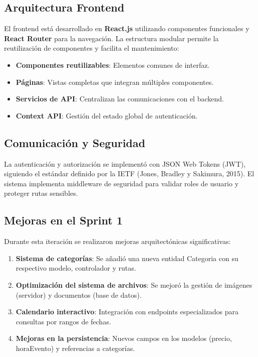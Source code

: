 \subsection*{Arquitectura Frontend}
El frontend está desarrollado en \textbf{React.js} utilizando componentes funcionales y \textbf{React Router} para la navegación. La estructura modular permite la reutilización de componentes y facilita el mantenimiento:
\begin{itemize}
  \item \textbf{Componentes reutilizables}: Elementos comunes de interfaz.
  \item \textbf{Páginas}: Vistas completas que integran múltiples componentes.
  \item \textbf{Servicios de API}: Centralizan las comunicaciones con el backend.
  \item \textbf{Context API}: Gestión del estado global de autenticación.
\end{itemize}

\subsection*{Comunicación y Seguridad}
La autenticación y autorización se implementó con JSON Web Tokens (JWT), siguiendo el estándar definido por la IETF (Jones, Bradley y Sakimura, 2015). El sistema implementa middleware de seguridad para validar roles de usuario y proteger rutas sensibles.

\subsection*{Mejoras en el Sprint 1}
Durante esta iteración se realizaron mejoras arquitectónicas significativas:
\begin{enumerate}
  \item \textbf{Sistema de categorías}: Se añadió una nueva entidad {Categoria} con su respectivo modelo, controlador y rutas.
  \item \textbf{Optimización del sistema de archivos}: Se mejoró la gestión de imágenes (servidor) y documentos (base de datos).
  \item \textbf{Calendario interactivo}: Integración con endpoints especializados para consultas por rangos de fechas.
  \item \textbf{Mejoras en la persistencia}: Nuevos campos en los modelos ({precio}, {horaEvento}) y referencias a categorías.
\end{enumerate}

